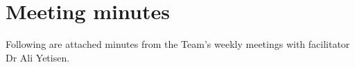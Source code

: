 \section{Meeting minutes}

Following are attached minutes from the Team's weekly meetings with facilitator Dr Ali Yetisen.

% 
% 
% 
% 
% 
% 
